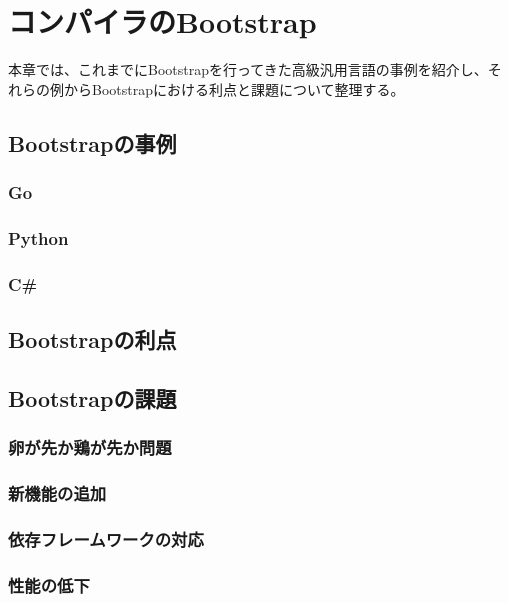 \chapter{コンパイラのBootstrap}
\label{explain-bootstrap}

本章では、これまでにBootstrapを行ってきた高級汎用言語の事例を紹介し、それらの例からBootstrapにおける利点と課題について整理する。

\section{Bootstrapの事例}
\label{explain-bootstrap:instance}

\subsection{Go}

\subsection{Python}

\subsection{C\#}

\section{Bootstrapの利点}
\label{explain-bootstrap:merit}

\section{Bootstrapの課題}
\label{explain-bootstrap:issue}

\subsection{卵が先か鶏が先か問題}

\subsection{新機能の追加}

\subsection{依存フレームワークの対応}

\subsection{性能の低下}

